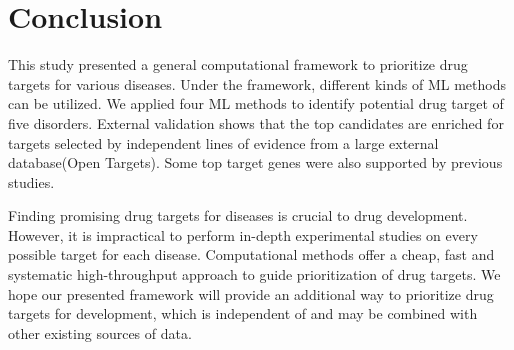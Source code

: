 \section{Conclusion}
  This study presented a general computational framework to prioritize drug targets for various diseases. Under the framework, different kinds of ML methods can be utilized.  We applied four ML methods to identify potential drug target of five disorders. External validation shows that the top candidates are enriched for targets selected by independent lines of evidence from a large external database(Open Targets). Some top target genes were also supported by previous studies.
  
  Finding promising drug targets for diseases is crucial to drug development. However, it is impractical to perform in-depth experimental studies on every possible target for each disease. Computational methods offer a cheap, fast and systematic high-throughput approach to guide prioritization of drug targets. We hope our presented framework will provide an additional way to prioritize drug targets for development, which is independent of and may be combined with other existing sources of data.

\chapterend